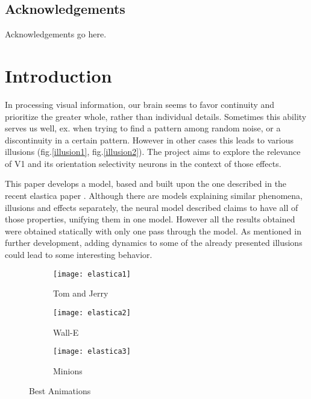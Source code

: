 \maketitle

\section*{Acknowledgements}
Acknowledgements go here. 

\tableofcontents
\listoffigures



\chapter{Introduction}

In processing visual information, our brain seems to favor continuity and prioritize the greater whole, rather than individual details. Sometimes this ability serves us well, ex. when trying to find a pattern among random noise, or a discontinuity in a certain pattern. However in other cases this leads to various illusions (fig.\ref{illusion1}, fig.\ref{illusion2}). The project aims to explore the relevance of V1 and its orientation selectivity neurons in the context of those effects. 

This paper develops a model, based and built upon the one described in the recent elastica paper \cite{keemink2015unified}. Although there are models explaining similar phenomena, illusions and effects separately, the neural model described claims to have all of those properties, unifying them in one model. However all the results obtained were obtained statically with only one pass through the model. As mentioned in further development, adding dynamics to some of the already presented illusions could lead to some interesting behavior.


\begin{figure}
  \centering
  \begin{subfigure}[b]{0.3\textwidth}
    \texttt{[image: elastica1]}
    \caption{Tom and Jerry}
    \label{fig:TomJerry}   
  \end{subfigure}             
  \begin{subfigure}[b]{0.3\textwidth}
    \texttt{[image: elastica2]}
    \caption{Wall-E}
    \label{fig:WallE}
  \end{subfigure}             
  \begin{subfigure}[b]{0.3\textwidth}
    \texttt{[image: elastica3]}
    \caption{Minions}
    \label{fig:Minnion}
  \end{subfigure}
  \caption{Best Animations}
  \label{fig:animations}
\end{figure}


